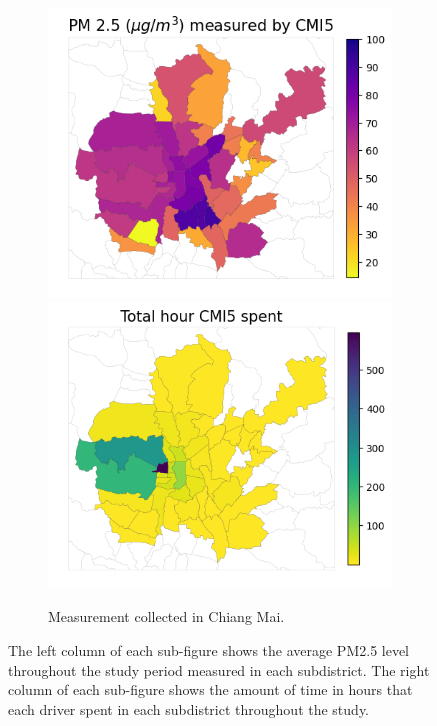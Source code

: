 \begin{figure}
\begin{subfigure}[t]{0.49\textwidth}
        \includegraphics[width=.5\linewidth]{figures/map/CMI5_PM25.png}%
        \includegraphics[width=.5\linewidth]{figures/map/CMI5_time.png}
        \caption{Measurement collected in Chiang Mai.}
    \end{subfigure}%
    \caption{
    The left column of each sub-figure shows the average PM2.5 level throughout the study period measured in each subdistrict.
    The right column of each sub-figure shows the amount of time in hours that each driver spent in each subdistrict throughout the study.
    }%
    \Description{}
    \label{fig:subdistrict-aqi}%
\end{figure}%
